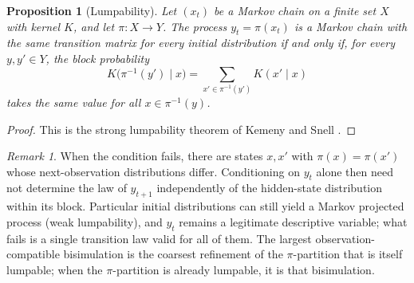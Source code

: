 \documentclass[11pt]{article}
\newtheorem{proposition}{Proposition}
\theoremstyle{definition}
\theoremstyle{remark}
\newtheorem*{remark}{Remark}
\begin{document}
\begin{proposition}[Lumpability]\label{prop:lump}
Let $(x_t)$ be a Markov chain on a finite set $X$ with kernel $K$, and let $\pi : X \to Y$. The process $y_t = \pi(x_t)$ is a Markov chain with the same transition matrix for every initial distribution if and only if, for every $y, y' \in Y$, the block probability
\[
K\big(\pi^{-1}(y') \mid x\big) = \sum_{x' \in \pi^{-1}(y')} K(x' \mid x)
\]
takes the same value for all $x \in \pi^{-1}(y)$.
\end{proposition}
\begin{proof}
This is the strong lumpability theorem of Kemeny and Snell \cite{kemeny1960}.
\end{proof}
\begin{remark}
When the condition fails, there are states $x, x'$ with $\pi(x) = \pi(x')$ whose next-observation distributions differ. Conditioning on $y_t$ alone then need not determine the law of $y_{t+1}$ independently of the hidden-state distribution within its block. Particular initial distributions can still yield a Markov projected process (weak lumpability), and $y_t$ remains a legitimate descriptive variable; what fails is a single transition law valid for all of them. The largest observation-compatible bisimulation is the coarsest refinement of the $\pi$-partition that is itself lumpable; when the $\pi$-partition is already lumpable, it is that bisimulation.
\end{remark}
\end{document}
